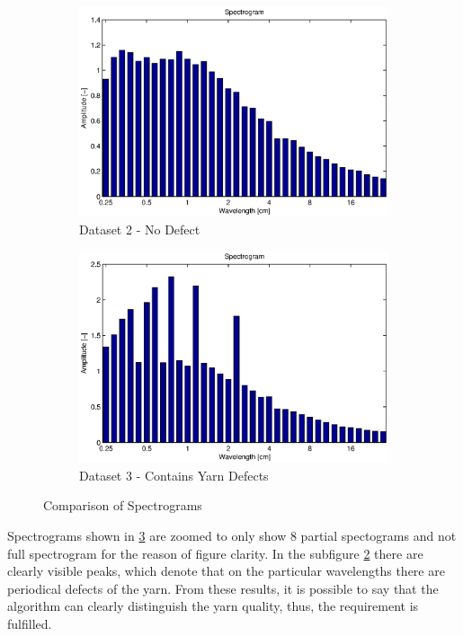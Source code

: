 \documentclass[twoside]{ctuthesis}
\theoremstyle{plain}
\theoremstyle{definition}
\theoremstyle{note}
\begin{document}
\begin{figure}
	\centering
	\begin{subfigure}{0.5\textwidth}
		\centering
		\includegraphics[width=1.0\linewidth]{prize1_short.eps}
		\caption{Dataset 2 - No Defect}
		\label{fig:specData2}
	\end{subfigure}%
	\begin{subfigure}{0.5\textwidth}
		\centering
		\includegraphics[width=1.0\linewidth]{moire1.eps}
		\caption{Dataset 3 - Contains Yarn Defects}
		\label{fig:specData3}
	\end{subfigure}
	\caption{Comparison of Spectrograms}
	\label{fig:specComparison}
\end{figure}

Spectrograms shown in \ref{fig:specComparison} are zoomed to only show 8 partial spectograms and not full spectrogram for the reason of figure clarity. In the subfigure \ref{fig:specData3} there are clearly visible peaks, which denote that on the particular wavelengths there are periodical defects of the yarn. From these results, it is possible to say that the algorithm can clearly distinguish the yarn quality, thus, the requirement is fulfilled.
\end{document}
